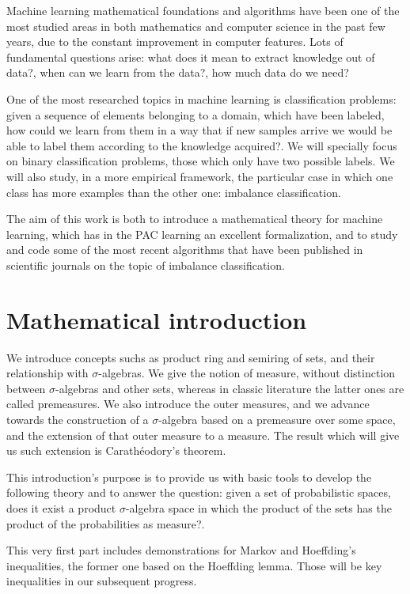 Machine learning mathematical foundations and algorithms have been one of the most studied areas in both mathematics and 
computer science in the past few years, due to the constant improvement in computer features. Lots of fundamental questions 
arise: what does it mean to extract knowledge out of data?, when can we learn from the data?, how much data do we need?

One of the most researched topics in machine learning is classification problems: given a sequence of elements belonging to
a domain, which have been labeled, how could we learn from them in a way that if new samples arrive we would be able to 
label them according to the knowledge acquired?. We will specially focus on binary classification problems, those which 
only have two possible labels. We will also study, in a more empirical framework, the particular case in which one 
class has more examples than the other one: imbalance classification.

The aim of this work is both to introduce a mathematical theory for machine learning, which has in the PAC learning 
an excellent formalization, and to study and code some of the most recent algorithms that have been published in scientific
journals on the topic of imbalance classification.

\section*{Mathematical introduction}
We introduce concepts suchs as product ring and semiring of sets, and their relationship with $\sigma$-algebras. We give
the notion of measure, without distinction between $\sigma$-algebras and other sets, whereas in classic literature the latter
ones are called premeasures. We also introduce the outer measures, and we advance towards the construction of a $\sigma$-algebra
based on a premeasure over some space, and the extension of that outer measure to a measure. The result which will give us
such extension is Carathéodory's theorem.

This introduction's purpose is to provide us with basic tools to develop the following theory and to answer the question:
given a set of probabilistic spaces, does it exist a product $\sigma$-algebra space in which the product of the sets has
the product of the probabilities as measure?.

This very first part includes demonstrations for Markov and Hoeffding's inequalities, the former one based on the Hoeffding
lemma. Those will be key inequalities in our subsequent progress.

